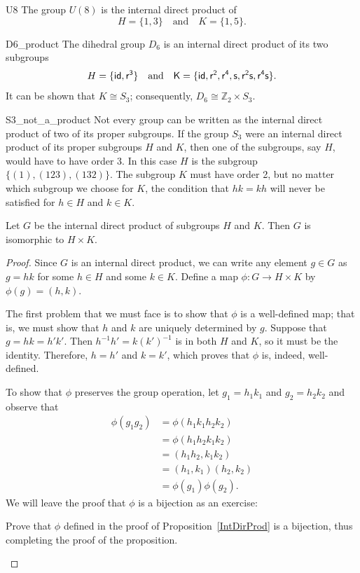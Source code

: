 \begin{example}{U8}
The group $U(8)$ is the internal direct product of
\[
H  = \{1, 3 \} \quad \text{and} \quad K  = \{1, 5 \}.
\]
\end{example}

 
\begin{example}{D6_product}
The dihedral group $D_6$ is an internal direct product of its two
subgroups 
\[
H  = \{\sf{id}, r^3  \} \quad \textrm{and} \quad
K  = \{\sf{id}, r^2, r^4, s, r^2s, r^4 s   \}.
\]
It can  be shown that $K \cong S_3$; consequently, $D_6 \cong
{\mathbb Z}_2 \times S_3$. 
\end{example}

 
\begin{example}{S3_not_a_product}
Not every group can be written as the internal direct product of two
of its proper subgroups.  If the group $S_3$ were an internal direct
product of its proper subgroups $H$ and $K$, then one of the  subgroups,
say $H$, would have to have order 3. In this case $H$ is the subgroup $\{
(1), (123), (132) \}$. The subgroup $K$ must have order 2, but no
matter which subgroup we choose for $K$, the condition that $hk = kh$
will never be satisfied for $h \in H$ and $k \in K$.
\mbox{\hspace{1in}}
\end{example}

 
\begin{thm}\label{IntDirProd}
Let $G$ be the internal direct product of  subgroups $H$ and $K$. Then
$G$ is isomorphic to $H \times K$. 
\end{thm}
 

\begin{proof}
Since $G$ is an internal direct product, we can write any element $g
\in G$ as $g =hk$ for some $h \in H$ and some $k \in K$. Define a map
$\phi : G \rightarrow H \times K$ by $\phi(g) = (h,k)$.

 
The first problem that we must face is to show that $\phi$ is a
well-defined map; that is, we must show that $h$ and $k$ are uniquely
determined by $g$. Suppose that $g = hk=h'k'$. Then $h^{-1} h'= k
(k')^{-1}$ is in both $H$ and $K$, so it must be the identity.
Therefore, $h = h'$ and $k = k'$, which proves that $\phi$ is, indeed,
well-defined. 

 
To show that $\phi$ preserves the group operation, let $g_1 = h_1 k_1$
and $g_2 = h_2 k_2$ and observe that 
\begin{align*}
\phi( g_1 g_2 ) & = \phi( h_1 k_1 h_2 k_2 )\\
& = \phi(h_1  h_2 k_1 k_2) \\
& = (h_1  h_2, k_1 k_2) \\
& = (h_1, k_1)( h_2, k_2) \\
& = \phi( g_1 ) \phi(  g_2 ).
\end{align*}
We will leave the proof that $\phi$ is a bijection as an exercise:

\begin{exercise}{}
Prove that  $\phi$ defined in the proof of Proposition~\ref{IntDirProd} is a bijection, thus completing the proof of the proposition.
 \end{exercise}


\end{proof}

